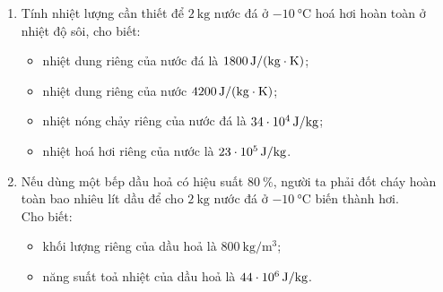 \begin{vd}
\begin{enumerate}[label=\alph*)]
			\item Tính nhiệt lượng cần thiết để $\SI{2}{\kilogram}$ nước đá ở $\SI{-10}{\celsius}$ hoá hơi hoàn toàn ở nhiệt độ sôi, cho biết:
			\begin{itemize}
				\item nhiệt dung riêng của nước đá là $\SI{1800}{\joule/\left(\kilogram\cdot\kelvin\right)}$;
				\item nhiệt dung riêng của nước $\SI{4200}{\joule/\left(\kilogram\cdot\kelvin\right)}$;
				\item nhiệt nóng chảy riêng của nước đá là $\SI{34E4}{\joule/\kilogram}$;
				\item nhiệt hoá hơi riêng của nước là $\SI{23E5}{\joule/\kilogram}$.
			\end{itemize}
			\item Nếu dùng một bếp dầu hoả có hiệu suất $\SI{80}{\percent}$, người ta phải đốt cháy hoàn toàn bao nhiêu lít dầu để cho $\SI{2}{\kilogram}$ nước đá ở $\SI{-10}{\celsius}$ biến thành hơi.\\
			Cho biết:
			\begin{itemize}
				\item khối lượng riêng của dầu hoả là $\SI{800}{\kilogram/\meter^3}$;
				\item năng suất toả nhiệt của dầu hoả là $\SI{44E6}{\joule/\kilogram}$.
			\end{itemize}
		\end{enumerate}
\end{vd}
